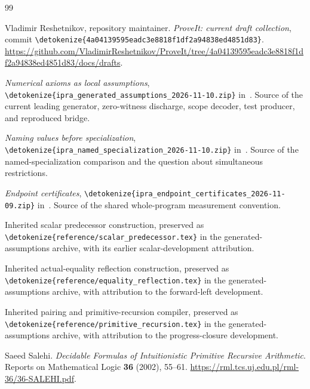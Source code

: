 \documentclass[11pt,letterpaper]{article}
\theoremstyle{definition}\newtheorem{definition}[theorem]{Definition}
\theoremstyle{remark}\newtheorem{remark}[theorem]{Remark}
\newcommand{\file}[1]{\expandafter\nolinkurl\expandafter{\detokenize{#1}}}
\begin{document}


\clearpage
\begin{thebibliography}{99}\raggedright
{}
Vladimir Reshetnikov, repository maintainer. \emph{ProveIt: current draft
collection}, commit \file{4a04139595eadc3e8818f1df2a94838ed4851d83}.
\url{https://github.com/VladimirReshetnikov/ProveIt/tree/4a04139595eadc3e8818f1df2a94838ed4851d83/docs/drafts}.

\emph{Numerical axioms as local assumptions},
\file{ipra_generated_assumptions_2026-11-10.zip} in~\cite{snapshot}.
Source of the current leading generator, zero-witness discharge,
scope decoder, test producer, and reproduced bridge.

\emph{Naming values before specialization},
\file{ipra_named_specialization_2026-11-10.zip} in~\cite{snapshot}.
Source of the named-specialization comparison and the question about
simultaneous restrictions.

\emph{Endpoint certificates},
\file{ipra_endpoint_certificates_2026-11-09.zip} in~\cite{snapshot}.
Source of the shared whole-program measurement convention.

Inherited scalar predecessor construction, preserved as
\file{reference/scalar_predecessor.tex} in the generated-assumptions
archive, with its earlier scalar-development attribution.

Inherited actual-equality reflection construction, preserved as
\file{reference/equality_reflection.tex} in the generated-assumptions
archive, with attribution to the forward-left development.

Inherited pairing and primitive-recursion compiler, preserved as
\file{reference/primitive_recursion.tex} in the generated-assumptions
archive, with attribution to the progress-closure development.

Saeed Salehi. \emph{Decidable Formulas of Intuitionistic Primitive
Recursive Arithmetic}. Reports on Mathematical Logic \textbf{36}
(2002), 55--61.
\url{https://rml.tcs.uj.edu.pl/rml-36/36-SALEHI.pdf}.
\end{thebibliography}
\end{document}
